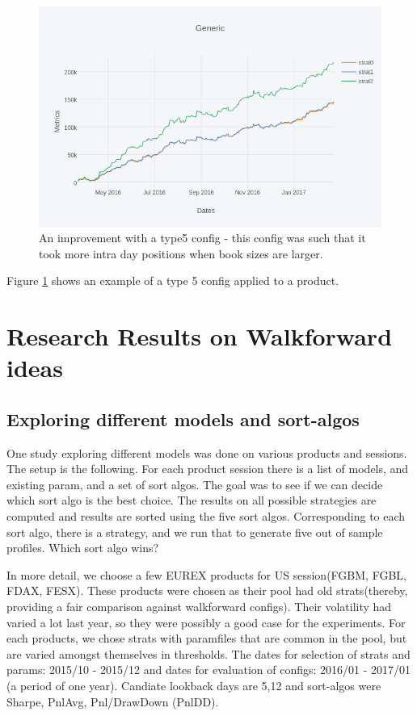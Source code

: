 \documentclass[a4paper]{article}
\begin{document}
\begin{centering}
	\begin{figure}
		
		\includegraphics[scale=0.7]{type5.png}
		
		\caption{An improvement with a type5 config - this config was such that it took more intra day positions when book sizes are larger.}
		\label{fig:type5}
		
	\end{figure}
\end{centering}

Figure \ref{fig:type5} shows an example of a type 5 config applied to a product.




\section{Research Results on Walkforward ideas}
\subsection{Exploring different models and sort-algos}
One study exploring different models was done on various products and sessions. The setup is the following. For each product session there is a list of models, and existing param, and a set of sort algos. The goal was to see if we can decide which sort algo is the best choice. The results on all possible strategies are computed and results are sorted using the five sort algos. Corresponding to each sort algo, there is a strategy, and we run that to generate five out of sample profiles. Which sort algo wins? 

In more detail, we choose a few EUREX products for US session(FGBM, FGBL, FDAX, FESX). These products were chosen as their pool had old strats(thereby, providing a fair comparison against walkforward configs). Their volatility had varied a lot last year, so they were possibly a good case for the experiments. For each products, we chose strats with paramfiles that are common in the pool, but are varied amongst themselves in thresholds. The dates for selection of strats and params: 2015/10 - 2015/12 and dates for evaluation of configs: 2016/01 - 2017/01 (a period of one year). Candiate lookback days are 5,12 and sort-algos were Sharpe, PnlAvg, Pnl/DrawDown (PnlDD).
\end{document}
